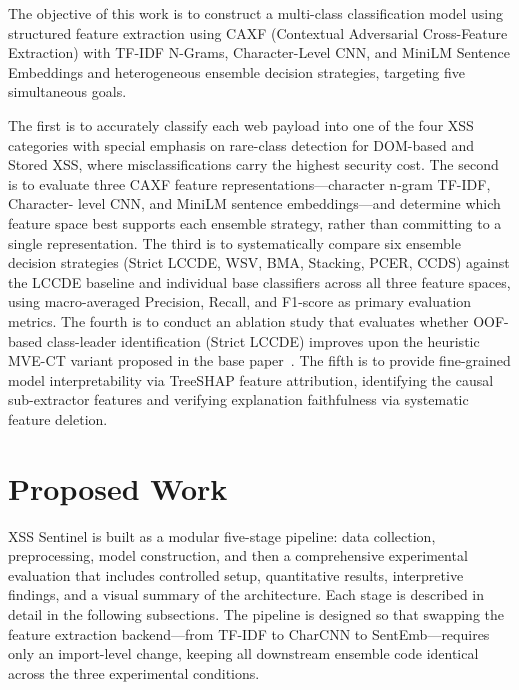 \documentclass[11pt,a4paper]{article}
\begin{document}
The objective of this work is to construct a multi-class classification model using structured feature
extraction using CAXF (Contextual Adversarial Cross-Feature Extraction) with TF-IDF N-Grams, Character-Level CNN, and MiniLM Sentence Embeddings and heterogeneous ensemble decision strategies, targeting five simultaneous goals. 

The first
is to accurately classify each web payload into one of the four XSS categories with special emphasis on
rare-class detection for DOM-based and Stored XSS, where misclassifications carry the highest security
cost. The second is to evaluate three CAXF feature representations---character n-gram TF-IDF, Character-
level CNN, and MiniLM sentence embeddings---and determine which feature space best supports each
ensemble strategy, rather than committing to a single representation. The third is to systematically
compare six ensemble decision strategies (Strict LCCDE, WSV, BMA, Stacking, PCER, CCDS) against
the LCCDE baseline and individual base classifiers across all three feature spaces, using macro-averaged
Precision, Recall, and F1-score as primary evaluation metrics. The fourth is to conduct an ablation
study that evaluates whether OOF-based class-leader identification (Strict LCCDE)
improves upon the heuristic MVE-CT variant proposed in the base paper~\cite{caxf_lccde2024}. The fifth
is to provide fine-grained model interpretability via TreeSHAP feature attribution, identifying the
causal sub-extractor features and verifying explanation faithfulness via systematic feature deletion.

\section{Proposed Work}
\label{sec:proposed}

XSS Sentinel is built as a modular five-stage pipeline: data collection, preprocessing, model
construction, and then a comprehensive experimental evaluation that includes controlled setup,
quantitative results, interpretive findings, and a visual summary of the architecture. Each stage
is described in detail in the following subsections. The pipeline is designed so that swapping the
feature extraction backend---from TF-IDF to CharCNN to SentEmb---requires only an import-level
change, keeping all downstream ensemble code identical across the three experimental conditions.
\end{document}
